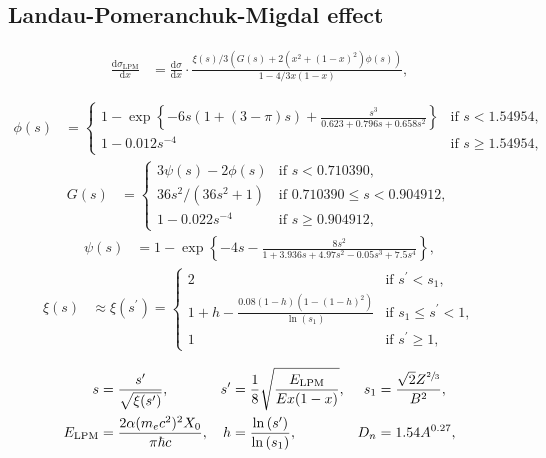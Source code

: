 \subsection{Landau-Pomeranchuk-Migdal effect}

\begin{align}
	\label{eqn:lpm_photopair}
	\frac{\mathrm{d}\sigma_\text{LPM}}{\mathrm{d}x} &= \frac{\mathrm{d}\sigma}{\mathrm{d}x} \cdot \frac{\xi(s) / 3 \left(G(s) + 2 \left( x^2 + (1 - x)^2 \right) \phi(s) \right)}{1 - 4 / 3 x (1 - x)},
\end{align}

\begin{align}
	\phi(s) &=
	\begin{cases}
		1 - \exp{\left\{ -6s \left(1 + (3 - \pi) s\right) + \frac{s^3}{ 0.623 + 0.796s + 0.658 s^2} \right\}} & \text{if $s < \num{1.54954}$}, \\
		1 - 0.012 s^{-4} & \text{if $s \geq \num{1.54954}$},
	\end{cases}
\end{align}
%
\begin{align}
	G(s) &=
	\begin{cases}
		3\psi(s) - 2\phi(s) & \text{if $s < \num{0.710390}$}, \\
		36s^2 / \left(36s^2 + 1 \right) & \text{if $\num{0.710390} \leq s < \num{0.904912}$}, \\
		1 - 0.022s^{-4} & \text{if $s \geq \num{0.904912}$},
	\end{cases}
\end{align}
%
\begin{align}
	\psi(s) &= 1 - \exp{\left\{ -4s - \frac{8s^2}{1 + 3.936s + 4.97s^2 - 0.05s^3 + 7.5 s^4} \right\}},
\end{align}
%
\begin{align}
	\xi(s) &\approx \xi(s^\prime) =
	\begin{cases}
		2 & \text{if $s^\prime < s_1$}, \\
		1 + h - \frac{0.08 (1 - h) (1 - (1-h)^2)}{\ln{(s_1)}} & \text{if $s_1 \leq s^\prime < 1$}, \\
		1 & \text{if $s^\prime \geq 1$},
	\end{cases}
\end{align}


\begin{align}
	s &= \frac{s^\prime}{\sqrt{\xi(s^\prime)}}, & s^\prime &= \frac{1}{8} \sqrt{\frac{E_\text{LPM}}{E x ( 1 - x)}}, & s_1 &= \frac{\sqrt{2} Z^{\sfrac{2}{3}}}{B^2}, \\ E_\text{LPM} &= \frac{2 \alpha (m_e c^2)^2 X_0}{\pi \hbar c}, & h &= \frac{\ln{(s^\prime)}}{\ln{(s_1)}}, & D_n &= 1.54 A^{0.27},
\end{align}


